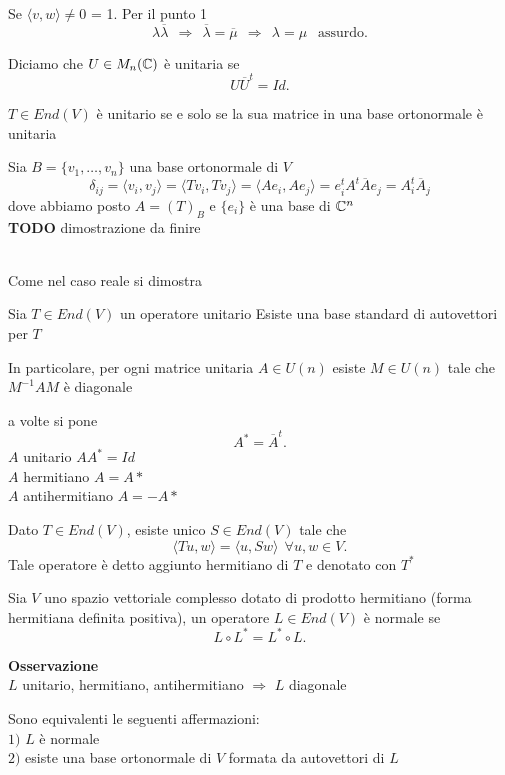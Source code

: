 \documentclass[12px]{article}
\begin{document}
Se $ \langle v, w \rangle \neq 0 $  \Rightarrow \lambda \overline{\mu} = 1. Per il punto 1\\
\[
	\lambda\overline{\lambda} \ \ \Rightarrow \ \ \overline{\lambda} = \overline{\mu} \ \ \Rightarrow \ \ \lambda = \mu \ \ \text{ assurdo}
.\] 
\begin{defi}
	Diciamo che $U\in M_n(\mathbb{C})$ è unitaria se 
	\[
		U\overline{U}^t = Id
	.\] 
\end{defi}
\begin{prop}
	$T\in End(V)$ è unitario se e solo se la sua matrice in una base ortonormale è unitaria
\end{prop}
\begin{dimo}
	Sia $B = \{v_1,\ldots,v_n\}$ una base ortonormale di $V$ 
	\[
		\delta_{ij} = \langle v_i, v_j \rangle  = \langle Tv_i, Tv_j \rangle  = \langle Ae_i, Ae_j \rangle = e_i^tA^t\overline{A}e_j = A_i^t\overline{A}_j
	\] 
	dove abbiamo posto $A = (T)_B$ e $\{e_i\}$ è una base di $\mathbb{C}^n$
	\\\textbf{TODO} dimostrazione da finire

\end{dimo}\\
Come nel caso reale si dimostra
\begin{teo}
	Sia $T\in End(V)$ un operatore unitario Esiste una base standard di autovettori per $T$
\end{teo} 
In particolare, per ogni matrice unitaria $A\in U(n)$ esiste $M\in U(n)$ tale che $M^{-1}AM$ è diagonale
\begin{nota}
	a volte si pone 
	\[
	 A^* = \overline{A}^t
	.\] 
	$A$ unitario $AA^* = Id$ \\
	$A$ hermitiano $A = A*$ \\
	$A$ antihermitiano $A=-A*$
\end{nota}
\begin{defi}
	Dato $T\in End(V)$, esiste unico $S\in End(V)$ tale che 
	\[
	\langle Tu, w \rangle = \langle u, Sw \rangle \ \ \forall u,w\in V
	.\] 
	Tale operatore è detto aggiunto hermitiano di $T$ e denotato con $T^*$
\end{defi}
\begin{defi}
	Sia $V$ uno spazio vettoriale complesso dotato di prodotto hermitiano (forma hermitiana definita positiva), un operatore $L\in End(V)$ è normale se 
	\[
	L\circ L^* = L^*\circ L
	.\] 
\end{defi}
\textbf{Osservazione}\\
$L$ unitario, hermitiano, antihermitiano $ \Rightarrow$ $L$ diagonale
\begin{teo}
	Sono equivalenti le seguenti affermazioni:\\
	$1)$ $L$ è normale\\
	$2)$ esiste una base ortonormale di $V$ formata da autovettori di $L$
\end{teo}
\end{document}
